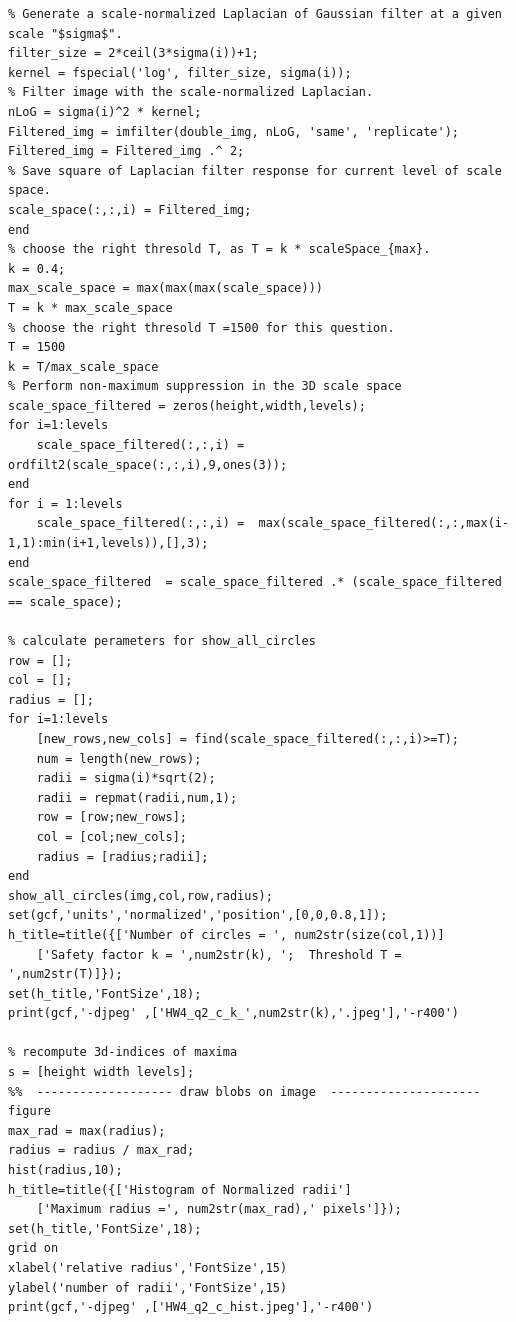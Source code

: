 \documentclass[letterpaper]{article}
\begin{document}
\begin{lstlisting}
% Generate a scale-normalized Laplacian of Gaussian filter at a given scale "$sigma$".
filter_size = 2*ceil(3*sigma(i))+1;
kernel = fspecial('log', filter_size, sigma(i));
% Filter image with the scale-normalized Laplacian.
nLoG = sigma(i)^2 * kernel;
Filtered_img = imfilter(double_img, nLoG, 'same', 'replicate');
Filtered_img = Filtered_img .^ 2;
% Save square of Laplacian filter response for current level of scale space.
scale_space(:,:,i) = Filtered_img;
end
% choose the right thresold T, as T = k * scaleSpace_{max}.
k = 0.4;
max_scale_space = max(max(max(scale_space)))
T = k * max_scale_space
% choose the right thresold T =1500 for this question.
T = 1500
k = T/max_scale_space
% Perform non-maximum suppression in the 3D scale space
scale_space_filtered = zeros(height,width,levels);
for i=1:levels
    scale_space_filtered(:,:,i) = ordfilt2(scale_space(:,:,i),9,ones(3));
end
for i = 1:levels
    scale_space_filtered(:,:,i) =  max(scale_space_filtered(:,:,max(i-1,1):min(i+1,levels)),[],3);
end
scale_space_filtered  = scale_space_filtered .* (scale_space_filtered == scale_space);

% calculate perameters for show_all_circles
row = [];
col = [];
radius = [];
for i=1:levels
    [new_rows,new_cols] = find(scale_space_filtered(:,:,i)>=T);
    num = length(new_rows);
    radii = sigma(i)*sqrt(2);
    radii = repmat(radii,num,1);
    row = [row;new_rows];
    col = [col;new_cols];
    radius = [radius;radii];
end
show_all_circles(img,col,row,radius);
set(gcf,'units','normalized','position',[0,0,0.8,1]);
h_title=title({['Number of circles = ', num2str(size(col,1))]
    ['Safety factor k = ',num2str(k), ';  Threshold T = ',num2str(T)]});
set(h_title,'FontSize',18);
print(gcf,'-djpeg' ,['HW4_q2_c_k_',num2str(k),'.jpeg'],'-r400')

% recompute 3d-indices of maxima
s = [height width levels];
%%  ------------------- draw blobs on image  ---------------------
figure
max_rad = max(radius);
radius = radius / max_rad;
hist(radius,10);
h_title=title({['Histogram of Normalized radii']
    ['Maximum radius =', num2str(max_rad),' pixels']});
set(h_title,'FontSize',18);
grid on
xlabel('relative radius','FontSize',15)
ylabel('number of radii','FontSize',15)
print(gcf,'-djpeg' ,['HW4_q2_c_hist.jpeg'],'-r400')
\end{lstlisting}
\end{document}
